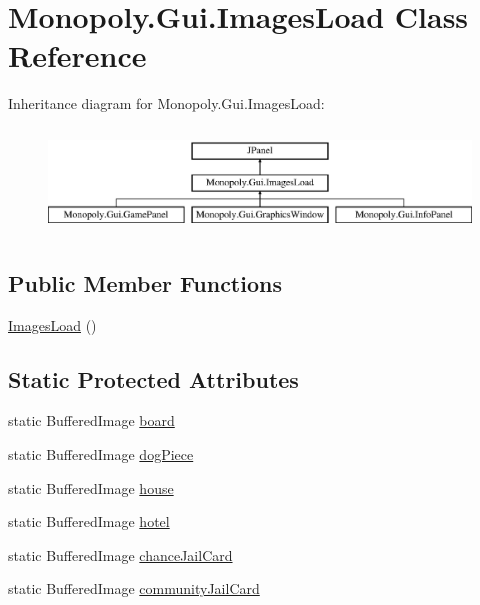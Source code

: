 \hypertarget{class_monopoly_1_1_gui_1_1_images_load}{}\section{Monopoly.\+Gui.\+Images\+Load Class Reference}
\label{class_monopoly_1_1_gui_1_1_images_load}
Inheritance diagram for Monopoly.\+Gui.\+Images\+Load\+:\begin{figure}[H]
\begin{center}
\leavevmode
\includegraphics[height=2.828283cm]{class_monopoly_1_1_gui_1_1_images_load}
\end{center}
\end{figure}
\subsection*{Public Member Functions}
\begin{DoxyCompactItemize}
\item 
\hyperlink{class_monopoly_1_1_gui_1_1_images_load_a9cde974a56cd0d34f372376d902131cd}{Images\+Load} ()
\end{DoxyCompactItemize}
\subsection*{Static Protected Attributes}
\begin{DoxyCompactItemize}
\item 
static Buffered\+Image \hyperlink{class_monopoly_1_1_gui_1_1_images_load_aa27f90f00ace7870fa2d223abd6c58de}{board}
\item 
static Buffered\+Image \hyperlink{class_monopoly_1_1_gui_1_1_images_load_aa7d816773b5894b3ff530ac1f86f164e}{dog\+Piece}
\item 
static Buffered\+Image \hyperlink{class_monopoly_1_1_gui_1_1_images_load_a085be516ecb31d5b75d8a0219dc223d0}{house}
\item 
static Buffered\+Image \hyperlink{class_monopoly_1_1_gui_1_1_images_load_a6af54624772426e590e5e85d2ec98437}{hotel}
\item 
static Buffered\+Image \hyperlink{class_monopoly_1_1_gui_1_1_images_load_acefdcb1c9e76a2905db1e8eb42da0fb5}{chance\+Jail\+Card}
\item 
static Buffered\+Image \hyperlink{class_monopoly_1_1_gui_1_1_images_load_addf89cd2902287adb11639523bb9f57c}{community\+Jail\+Card}
\end{DoxyCompactItemize}


